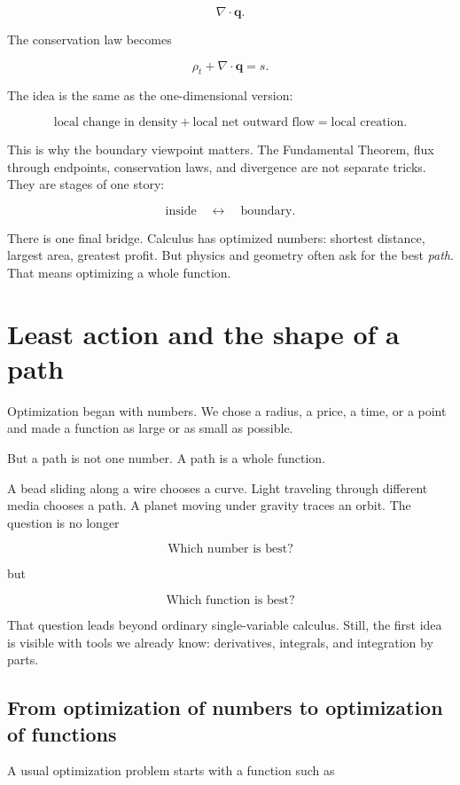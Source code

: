 \[
\nabla\cdot \mathbf{q}.
\]

The conservation law becomes

\[
\boxed{
\rho_t+\nabla\cdot\mathbf{q}=s.
}
\]

The idea is the same as the one-dimensional version:

\[
\boxed{
\text{local change in density}
+
\text{local net outward flow}
=
\text{local creation}.
}
\]

This is why the boundary viewpoint matters.  The Fundamental Theorem, flux through
endpoints, conservation laws, and divergence are not separate tricks.  They are stages
of one story:

\[
\text{inside} \quad \longleftrightarrow \quad \text{boundary}.
\]

There is one final bridge.  Calculus has optimized numbers: shortest distance, largest
area, greatest profit.  But physics and geometry often ask for the best \emph{path}.  That
means optimizing a whole function.

\section{Least action and the shape of a path}
\label{sec:least-action-shape-path}

Optimization began with numbers.  We chose a radius, a price, a time, or a point and
made a function as large or as small as possible.

But a path is not one number.  A path is a whole function.

A bead sliding along a wire chooses a curve.  Light traveling through different media
chooses a path.  A planet moving under gravity traces an orbit.  The question is no
longer

\[
\text{Which number is best?}
\]

but

\[
\boxed{
\text{Which function is best?}
}
\]

That question leads beyond ordinary single-variable calculus.  Still, the first idea is
visible with tools we already know: derivatives, integrals, and integration by parts.

\subsection{From optimization of numbers to optimization of functions}
\label{subsec:optimization-numbers-to-functions}

A usual optimization problem starts with a function such as

